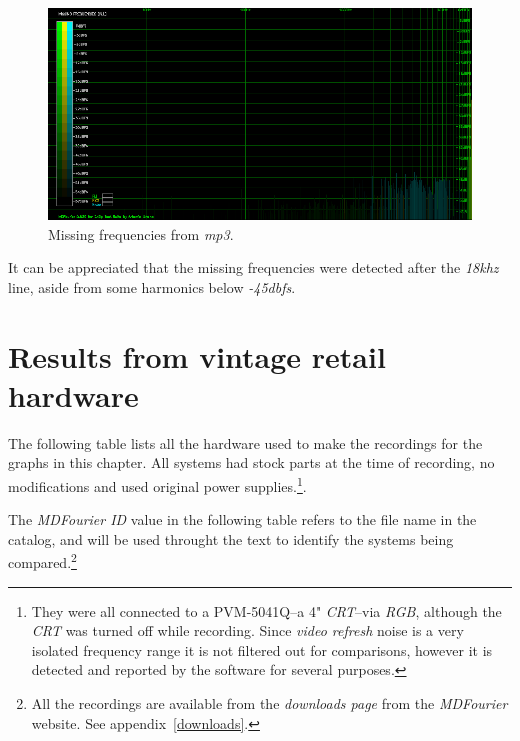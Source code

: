 \documentclass[10pt,a4paper]{report}
\newcommand{\ac}[1]{\textit{\mbox{\acrshort{#1}}}}
\newcommand{\khz}[1]{\textit{\mbox{#1\acrshort{khz}}}}
\newcommand{\db}[1]{\textit{\mbox{#1\acrshort{dbfs}}}}
\begin{document}
\begin{figure}[H]
	\centering
	\includegraphics[width=1.0\linewidth]{images/interpretation/Plot6-mp3-3.png}
	\caption[MP3 Missing]{Missing frequencies from \ac{mp3}.}
	\label{fig:plot6-mp3-3}
\end{figure}

It can be appreciated that the missing frequencies were detected after the \khz{18} line, aside from some harmonics below \db{-45}.

\chapter{Results from vintage retail hardware}
\label{results}

The following table lists all the hardware used to make the recordings for the graphs in this chapter. All systems had stock parts at the time of recording, no modifications and used original power supplies.\footnote{They were all connected to a PVM-5041Q--a 4" \textit{CRT}--via \textit{RGB}, although the \textit{CRT} was turned off while recording. Since \textit{video refresh} noise is a very isolated frequency range it is not filtered out for comparisons, however it is detected and reported by the software for several purposes.}. 

The \textit{MDFourier ID} value in the following table refers to the file name in the catalog, and will be used throught the text to identify the systems being compared.\footnote{All the recordings are available from the \textit{downloads page} from the \textit{MDFourier} website. See appendix~\ref{downloads}.}
\end{document}
